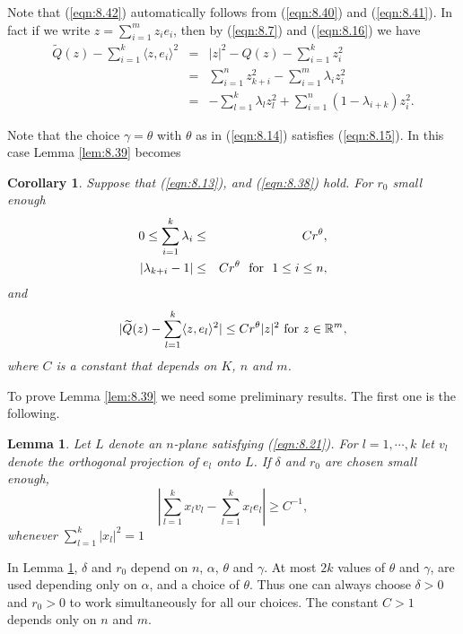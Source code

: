 \documentclass[12pt,leqno]{article}
\newcommand{\RR}{\mathbb{R}}
\theoremstyle{plain}
\newtheorem{lem}[thm]{Lemma}
\newtheorem{cor}[thm]{Corollary}
\numberwithin{equation}{section}
\begin{document}
Note that (\ref{eqn:8.42}) automatically follows from (\ref{eqn:8.40}) and
(\ref{eqn:8.41}). In fact if we write
$z=\mathop{\sum}\limits^{m}_{i=1}z_ie_i$, then by (\ref{eqn:8.7}) and
(\ref{eqn:8.16}) we have
\begin{eqnarray}\label{eqn:8.43}
\widetilde Q(z)-\sum_{i=1}^k\langle z,e_i\rangle^2 & = & |z|^2-Q(z)-
\sum_{i=1}^k z^2_i \\
& = & \sum^n_{i=1}z^2_{k+i}-\sum^m_{i=1}\lambda_iz^2_i \nonumber \\
& = & -\sum^k_{l=1}\lambda_lz^2_{l} + \sum^n_{i=1}(1-\lambda_{i+k})z^2_i.
\nonumber
\end{eqnarray}

Note that the choice $\gamma=\theta$ with $\theta$ as in (\ref{eqn:8.14})
satisfies (\ref{eqn:8.15}). In this case
Lemma \ref{lem:8.39} becomes

\begin{cor}\label{cor:8.39B}
Suppose that (\ref{eqn:8.13}), and (\ref{eqn:8.38}) hold.
For $r_0$ small enough
\begin{eqnarray}
0  \le  \sum_{i=1}^k\lambda_i &\le& Cr^\theta, \label{eqn:8.40B} \\
|\lambda_{k+i}-1| & \le & Cr^{\theta}
\ \hbox{ for }\ 1\le i\le n,
\label{eqn:8.41B}
\end{eqnarray}
and
\begin{equation}\label{eqn:8.42B}
|\widetilde Q(z)-\sum_{l=1}^k\langle z,e_l\rangle^2|
\le Cr^\theta
|z|^2\hbox{ for
}z\in\RR^{m},
\end{equation}
where $C$ is a constant that depends on $K$, $n$ and $m$.
\end{cor}


To prove Lemma \ref{lem:8.39} we need some preliminary results. The first one is the following.



\begin{lem}\label{lem:8.22}
Let $L$ denote an $n$-plane satisfying
(\ref{eqn:8.21}). For $l=1,\cdots, k$ let $v_l$ denote the orthogonal
projection of $e_l$ onto $L$.
If $\delta$ and $r_0$ are chosen small enough,
\begin{equation}\label{eqn:8.23}
|\sum_{l=1}^k x_l v_l-\sum_{l=1}^k x_l e_l|\ge C^{-1},
\end{equation}
whenever $\sum_{l=1}^k |x_l|^2=1$
\end{lem}

\noindent In Lemma \ref{lem:8.22}, $\delta$ and $r_0$ depend on $n$,
$\alpha$, $\theta$ and $\gamma$. At most $2k$ values
of $\theta$ and $\gamma$, are used depending only on
$\alpha$, and a choice of $\theta$. Thus one can always choose
$\delta>0$ and $r_0>0$ to work simultaneously for all our choices.
The constant $C>1$ depends only on $n$ and $m$.
\end{document}

